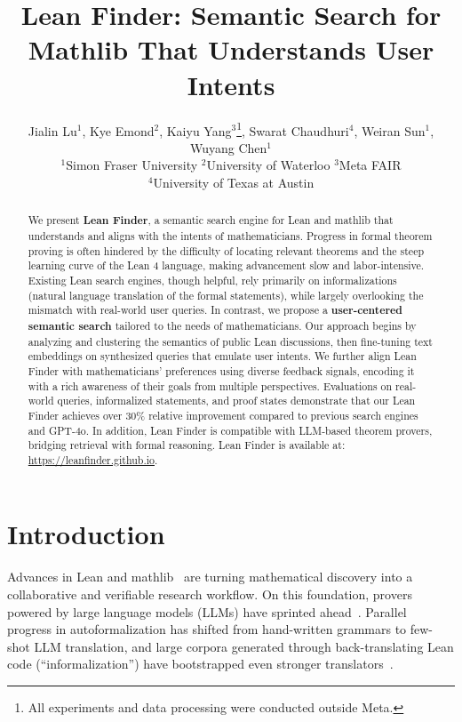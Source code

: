 \documentclass{article} %
\title{Lean Finder: Semantic Search for Mathlib That Understands User Intents}
\author{
  Jialin Lu$^{1}$,
  Kye Emond$^{2}$,
  Kaiyu Yang$^{3}$\thanks{All experiments and data processing were conducted outside Meta.},
  Swarat Chaudhuri$^{4}$,
  Weiran Sun$^{1}$,
  Wuyang Chen$^{1}$ \\
  $^{1}$Simon Fraser University \quad
  $^{2}$University of Waterloo \quad
  $^{3}$Meta FAIR \\
  $^{4}$University of Texas at Austin \quad
}
\begin{document}
\maketitle

\begin{abstract}
We present \textbf{Lean Finder}, a semantic search engine for Lean and mathlib that understands and aligns with the intents of mathematicians.
Progress in formal theorem proving is often hindered by the difficulty of locating relevant theorems and the steep learning curve of the Lean 4 language, making advancement slow and labor-intensive.
Existing Lean search engines, though helpful, rely primarily on informalizations (natural language translation of the formal statements), while largely overlooking the mismatch with real-world user queries.
In contrast, we propose a \textbf{user-centered semantic search} tailored to the needs of mathematicians. Our approach begins by analyzing and clustering the semantics of public Lean discussions, then fine-tuning text embeddings on synthesized queries that emulate user intents. We further align Lean Finder with mathematicians’ preferences using diverse feedback signals, encoding it with a rich awareness of their goals from multiple perspectives.
Evaluations on real-world queries, informalized statements, and proof states demonstrate that our Lean Finder achieves over 30\% relative improvement compared to previous search engines and GPT-4o.
In addition, Lean Finder is compatible with LLM-based theorem provers, bridging retrieval with formal reasoning. Lean Finder is available at: \url{https://leanfinder.github.io}.
\end{abstract}

\section{Introduction}
\label{sec:intro}
Advances in Lean and mathlib~\citep{de2015lean,moura2021lean}
are
turning mathematical discovery into a collaborative and verifiable research workflow.
On this foundation, provers powered by large language models (LLMs) have sprinted ahead~\citep{alphaproof,xin2024deepseek,xin2024deepseekv15,ren2025deepseek,lin2025goedel}.
Parallel progress in autoformalization has shifted from hand-written grammars to few-shot LLM translation,
and large corpora generated through back-translating Lean code (``informalization'') have bootstrapped even stronger translators~\citep{wu2022autoformalization,jiang2023multilingual,lu2024process}.
\end{document}
